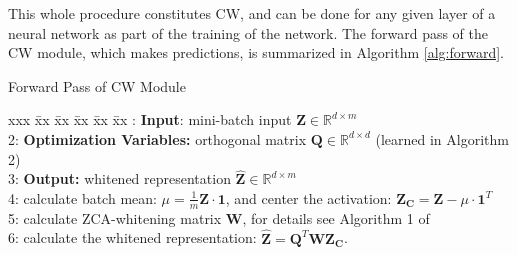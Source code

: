 \documentclass{article}
\begin{document}
This whole procedure constitutes CW, and can be done for any given layer of a neural network as part of the training of the network. The forward pass of the CW module, which makes predictions, is summarized in Algorithm \ref{alg:forward}.

\begin{algorithm*}[ht]
 \caption{Forward Pass of CW Module}
 \begin{tabbing}
 xxx \= xx \= xx \= xx \= xx \= xx : \> \textbf{Input}: mini-batch input $\mathbf{Z} \in \mathbb{R}^{d\times m}$ \\
 2: \> \textbf{Optimization Variables:} orthogonal matrix $\mathbf{Q}\in \mathbb{R}^{d\times d}$ (learned in Algorithm 2)\\
 3: \> \textbf{Output:} whitened representation $\mathbf{\hat Z} \in \mathbb{R}^{d\times m}$ \\
 4: \> calculate batch mean: $\mu = \frac{1}{m} \mathbf{Z}\cdot\mathbf{1}$, and center the activation: $\mathbf{Z_C} = \mathbf{Z} - \mu\cdot\mathbf{1}^T$ \\
 5: \> calculate ZCA-whitening matrix $\mathbf{W}$, for details see Algorithm 1 of \cite{huang2019iterative}  \\
 6: \> calculate the whitened representation: $\mathbf{\hat Z} = \mathbf{Q}^T\mathbf{W}\mathbf{Z_C}$.
 \end{tabbing}
 \label{alg:forward}
\end{algorithm*}
\end{document}
